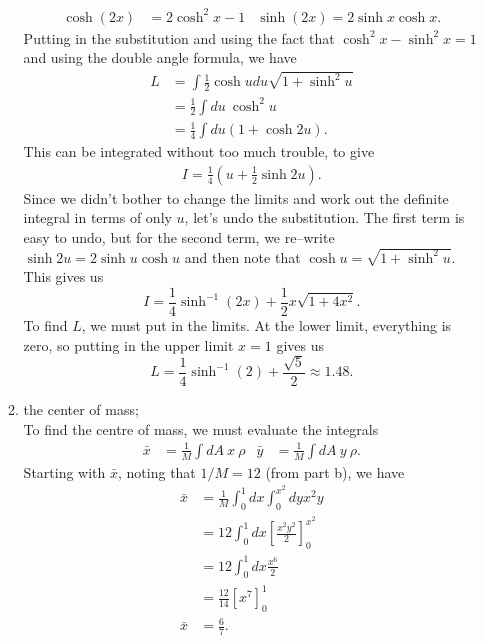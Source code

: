 \documentclass{article}
\begin{document}
\begin{enumerate}
\begin{enumerate}
{			\begin{align*}
				\cosh (2x) &= 2 \cosh^2 x - 1 & \sinh (2x) = 2 \sinh x \cosh x . 
			\end{align*}
			Putting in the substitution and using the fact that $\cosh^2 x - \sinh^2 x = 1$ and using the double angle formula, we have 
			\begin{align*}
				L &= \int \frac{1}{2} \cosh u du \sqrt{1 + \sinh^2 u} \\
				&= \frac{1}{2} \int du \ \cosh^2 u \\
				&= \frac{1}{4} \int du (1 + \cosh 2u) .
			\end{align*}
			This can be integrated without too much trouble, to give 
			\begin{align*}
				I = \frac{1}{4} \left( u + \frac{1}{2} \sinh 2u \right).
			\end{align*}
			Since we didn't bother to change the limits and work out the definite integral in terms of only $u$, let's undo the substitution.  The first term is easy to undo, but for the second term, we re--write $\sinh 2u = 2 \sinh u \cosh u$ and then note that $\cosh u = \sqrt{1 + \sinh^2 u}$.  This gives us 
			\begin{equation*}
				I = \frac{1}{4} \sinh^{-1} (2x) + \frac{1}{2} x \sqrt{1 + 4x^2} .
			\end{equation*}
			To find $L$, we must put in the limits.  At the lower limit, everything is zero, so putting in the upper limit $x=1$ gives us 
			\begin{equation*}
				L = \frac{1}{4} \sinh^{-1} (2) + \frac{\sqrt{5}}{2} \approx 1.48.
			\end{equation*}
		}
		\item{the center of mass; \\
		To find the centre of mass, we must evaluate the integrals 
			\begin{align*}
				\bar{x} &= \frac{1}{M} \int dA \ x \ \rho & \bar{y} &= \frac{1}{M} \int dA \ y \ \rho .
			\end{align*}
			Starting with $\bar{x}$, noting that $1/M = 12$ (from part b), we have 
			\begin{align*}
				\bar{x} &= \frac{1}{M} \int_0^1 dx \int_0^{x^2} dy x^2 y \\
				&= 12 \int_0^1 dx \left[ \frac{x^2 y^2}{2} \right]_0^{x^2} \\
				&= 12 \int_0^1 dx \frac{x^6}{2} \\
				&= \frac{12}{14} \left[ x^7 \right]_0^1 \\
				\bar{x} &= \frac{6}{7}. 

\end{align*}}
\end{enumerate}
\end{enumerate}
\end{document}
